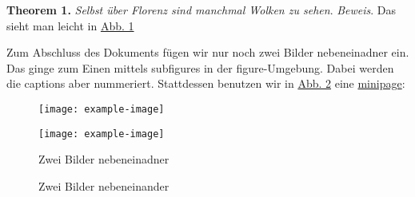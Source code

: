 \documentclass{scrartcl}
\begin{document}
\noindent \textbf{Theorem 1.} \textit{Selbst \"uber Florenz sind manchmal Wolken zu sehen}.
\newline \textit{Beweis}. Das sieht man leicht in \hyperref[abb1]{Abb. 1} 
\newline
\newline

Zum Abschluss des Dokuments f\"ugen wir nur noch zwei Bilder nebeneinadner ein. Das ginge zum Einen mittels subfigures in
der figure-Umgebung. Dabei werden die captions aber nummeriert. Stattdessen benutzen wir in \hyperref[abb2]{Abb. 2} eine
\href{https://www.namsu.de/Extra/befehle/Minipage.html}{minipage}:
\newline

\begin{figure}[h]
\begin{minipage}[c]{0.5\textwidth}
    \texttt{[image: example-image]}
\end{minipage}
\begin{minipage}[c]{0.5\textwidth}
    \texttt{[image: example-image]}
\end{minipage}

\caption{Zwei Bilder nebeneinander}{Zwei Bilder nebeneinadner}
\label{abb2}
\end{figure}

\listoftables

\listoffigures
\end{document}
